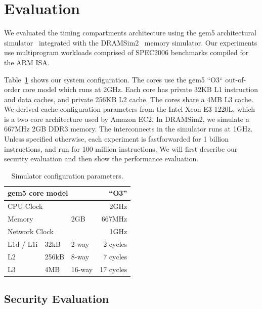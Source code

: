 \section{Evaluation}

We evaluated the timing compartments architecture using the gem5 architectural 
simulator~\cite{gem5} integrated with the DRAMSim2~\cite{DRAMSim2} memory 
simulator. Our experiments use multiprogram workloads comprised of SPEC2006 
benchmarks compiled for the ARM ISA. 

Table~\ref{tab:config} shows our system configuration.
The cores use the gem5 ``O3`` out-of-order core model which runs at 2GHz.  Each 
core has private 32KB L1 instruction and data caches, and private 256KB L2 
cache. The cores share a 4MB L3 cache. We derived cache configuration 
parameters from the Intel Xeon E3-1220L, which is a two core architecture used 
by Amazon EC2. In DRAMSim2, we simulate a 667MHz 2GB DDR3 memory. The 
interconnects in the simulator runs at 1GHz. Unless specified otherwise, each 
experiment is fastforwarded for 1 billion instructions, and run for 100 million 
instructions. We will first describe our security evaluation and then show
the performance evaluation.

\begin{table}
    \caption{Simulator configuration parameters.}
    \centering
    \begin{tabular}{|l|l|l|r|}
        \hline
        \multicolumn{3}{|l|}{gem5 core model} & ``O3''        \\\hline
        \multicolumn{3}{|l|}{CPU Clock}    & 2GHz             \\\hline
        \hline
        \multicolumn{2}{|l|}{Memory}             & 2GB    & 667MHz  \\\hline
        \hline
        \multicolumn{3}{|l|}{Network Clock}      & 1GHz \\\hline
        \hline
        L1d / L1i  & 32kB   & 2-way  & 2 cycles\\\hline
        L2         & 256kB  & 8-way  & 7 cycles \\\hline
        L3         & 4MB    & 16-way & 17 cycles  \\\hline
    \end{tabular}
    \label{tab:config}
\end{table}

\subsection{Security Evaluation}

